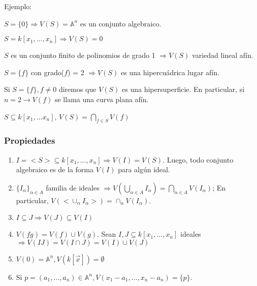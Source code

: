 Ejemplo:

\begin{itemize*}
\item $S= \{ 0 \} \Rightarrow V(S)= \mathbb{A}^n$ es un conjunto algebraico.
\item $S=k[x_1, \dots, x_n] \Rightarrow V(S)= 0$
\item $S$ es un conjunto finito de polinomios de grado 1 $\Rightarrow V(S)$ variedad lineal afín.
\item $S=\{f \}$ con grado($f$) = 2 $\Rightarrow V(S)$ es una hipercuádrica lugar afín.
\end{itemize*}

\begin{nota}
Si $S=\{f \}, f\neq 0$ diremos que $V(S)$ es una hipersuperficie. En particular, si $n=2 \rightarrow V(f)$ se llama una curva plana afín. 
\end{nota}

\begin{nota}
$S\subseteq k[x_1,\dots x_n]$, $V(S)=\bigcap_{f\in S}V(f)$
\end{nota}

\subsubsection{Propiedades}

\begin{enumerate}
\item $I=<S>\subseteq k[x_1,\dots , x_n] \Rightarrow V(I)=V(S)$. Luego, todo conjunto algebraico es de la forma $V(I)$ para algún ideal.

\item $\{ I_\alpha \}_{\alpha \in A}$ familia de ideales $\Rightarrow V(\bigcup_{\alpha \in A}I_\alpha )=\bigcap_{\alpha \in A} V(I_\alpha)$; En particular, $V(<\cup_\alpha I_\alpha >)=\cap_\alpha V(I_\alpha)$.
\item $I\subseteq J \Rightarrow V(J)\subseteq V(I)$
\item $V(fg)=V(f)\cup V(g)$. Sean $I,J\subseteq k[x_1,\dots,x_n]$ ideales $\Rightarrow V(IJ)=V(I\cap J)=V(I)\cup V(J)$
\item $V(0)=\mathbb{A}^n, V(k[\vec{x}])=\emptyset$
\item Si $p=(a_1,\dots, a_n)\in \mathbb{A}^n, V(x_1-a_1,\dots,x_n-a_n)=\{p \}$.
\end{enumerate}


